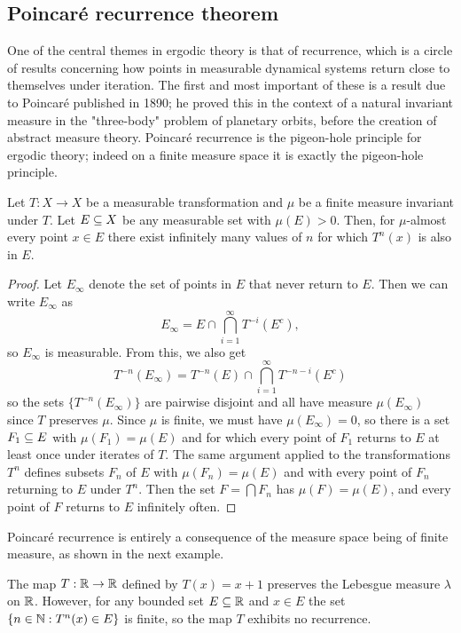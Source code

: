 \subsection{Poincar\'e recurrence theorem}
One of the central themes in ergodic theory is that of recurrence, which is a circle of results concerning how points in measurable dynamical systems return close to themselves under iteration. The first and most important of these is a result due to Poincar\'e published in 1890; he proved this in the context of a natural invariant measure in the "three-body" problem of planetary orbits, before the creation of abstract measure theory. Poincar\'e recurrence is the pigeon-hole principle for ergodic theory; indeed on a finite measure space it is exactly the pigeon-hole principle.
\begin{theorem}\label{Poincare recurrence thm}
Let $T:X\to X$ be a measurable transformation and $\mu$ be a finite measure invariant under $T$. Let $E\subseteq X$ be any measurable set with $\mu(E)>0$. Then, for $\mu$-almost every point $x\in E$ there exist infinitely many values of $n$ for which $T^n(x)$ is also in $E$.
\end{theorem}
\begin{proof}
Let $E_\infty$ denote the set of points in $E$ that never return to $E$. Then we can write $E_\infty$ as
\[E_\infty=E\cap\bigcap_{i=1}^{\infty}T^{-i}(E^c),\]
so $E_\infty$ is measurable. From this, we also get
\[T^{-n}(E_\infty)=T^{-n}(E)\cap\bigcap_{i=1}^{\infty}T^{-n-i}(E^c)\]
so the sets $\{T^{-n}(E_\infty)\}$ are pairwise disjoint and all have measure $\mu(E_\infty)$ since $T$ preserves $\mu$. Since $\mu$ is finite, we must have $\mu(E_\infty)=0$, so there is a set $F_1\subseteq E$ with $\mu(F_1)=\mu(E)$ and for which every point of $F_1$ returns to $E$ at least once under iterates of $T$. The same argument applied to the transformations $T^n$ defines subsets $F_n$ of $E$ with $\mu(F_n)=\mu(E)$ and with every point of $F_n$ returning to $E$ under $T^n$. Then the set $F=\bigcap F_n$ has $\mu(F)=\mu(E)$, and every point of $F$ returns to $E$ infinitely often.
\end{proof}
Poincar\'e recurrence is entirely a consequence of the measure space being of finite measure, as shown in the next example.
\begin{example}
The map $T:\mathbb{R}\to\mathbb{R}$ defined by $T(x)=x+1$ preserves the Lebesgue measure $\lambda$ on $\mathbb{R}$. However, for any bounded set $E\subseteq\mathbb{R}$ and $x\in E$ the set $\{n\in\mathbb{N}:T^n(x)\in E\}$ is finite, so the map $T$ exhibits no recurrence.
\end{example}
